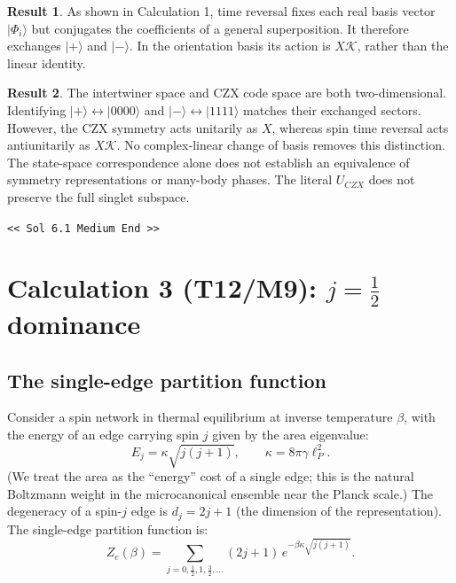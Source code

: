 \documentclass[11pt,a4paper]{article}
\newcommand{\hf}{\tfrac{1}{2}}
\newcommand{\lp}{\ell_P}
\theoremstyle{definition}
\newtheorem{result}{Result}
\newcommand{\GPTEnd}{\par\noindent\textcolor{GPTMarker}{\texttt{\textless\textless{} Sol 6.1 Medium End \textgreater\textgreater}}\par}
\begin{document}
\begin{result}\label{res:TR}
As shown in Calculation 1, time reversal fixes each real basis vector
$|\Phi_i\rangle$ but conjugates the coefficients of a general superposition.
It therefore exchanges $|+\rangle$ and $|-\rangle$. In the orientation
basis its action is $X\mathcal K$, rather than the linear identity.
\end{result}

\begin{result}\label{res:correct-correspondence}
The intertwiner space and CZX code space are both two-dimensional.
Identifying $|+\rangle\leftrightarrow|0000\rangle$ and
$|-\rangle\leftrightarrow|1111\rangle$ matches their exchanged sectors.
However, the CZX symmetry acts unitarily as $X$, whereas spin time reversal
acts antiunitarily as $X\mathcal K$. No complex-linear change of basis
removes this distinction. The state-space correspondence alone does not
establish an equivalence of symmetry representations or many-body phases.
The literal $U_{CZX}$ does not preserve the full singlet subspace.
\end{result}

\GPTEnd{}


\section{Calculation 3 (T12/M9): $j=\tfrac{1}{2}$ dominance}
\label{sec:calc3}

\subsection{The single-edge partition function}
\label{sub:Z-edge}

Consider a spin network in thermal equilibrium at inverse temperature $\beta$,
with the energy of an edge carrying spin $j$ given by the area eigenvalue:
\begin{equation}\label{eqn:area-energy}
  E_j = \kappa\sqrt{j(j+1)},\qquad \kappa = 8\pi\gamma\lp^2.
\end{equation}
(We treat the area as the ``energy'' cost of a single edge; this is the
natural Boltzmann weight in the microcanonical ensemble near the Planck scale.)
The degeneracy of a spin-$j$ edge is $d_j = 2j+1$ (the dimension of the
representation).  The single-edge partition function is:
\begin{equation}\label{eqn:Ze}
  Z_e(\beta)
  = \sum_{j=0,\hf,1,\frac{3}{2},\ldots}
    (2j+1)\,e^{-\beta\kappa\sqrt{j(j+1)}}.
\end{equation}
\end{document}

